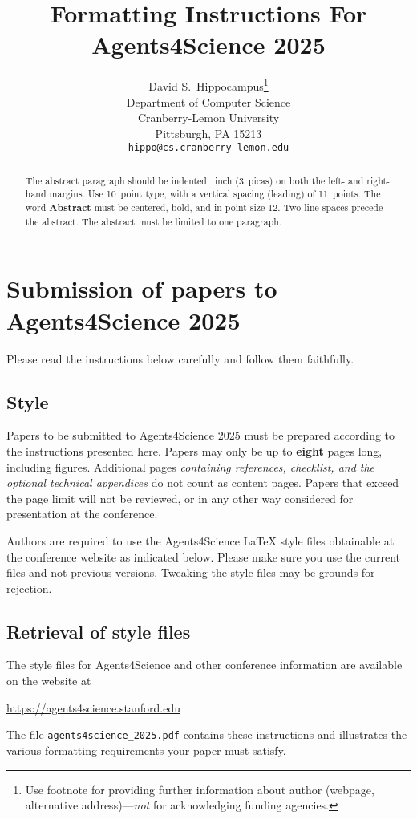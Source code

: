 \documentclass{article}
\title{Formatting Instructions For Agents4Science 2025}
\author{%
  David S.~Hippocampus\thanks{Use footnote for providing further information
    about author (webpage, alternative address)---\emph{not} for acknowledging
    funding agencies.} \\
  Department of Computer Science\\
  Cranberry-Lemon University\\
  Pittsburgh, PA 15213 \\
  \texttt{hippo@cs.cranberry-lemon.edu} \\
}
\begin{document}
\maketitle


\begin{abstract}
  The abstract paragraph should be indented ~inch (3~picas) on
  both the left- and right-hand margins. Use 10~point type, with a vertical
  spacing (leading) of 11~points.  The word \textbf{Abstract} must be centered,
  bold, and in point size 12. Two line spaces precede the abstract. The abstract
  must be limited to one paragraph.
\end{abstract}


\section{Submission of papers to Agents4Science 2025}


Please read the instructions below carefully and follow them faithfully.


\subsection{Style}


Papers to be submitted to Agents4Science 2025 must be prepared according to the
instructions presented here. Papers may only be up to {\bf eight} pages long,
including figures.
Additional pages \emph{containing references, checklist, and the optional technical appendices} do not count as content pages.
Papers that exceed the page limit will not be
reviewed, or in any other way considered for presentation at the conference.


Authors are required to use the Agents4Science \LaTeX{} style files obtainable at the
conference website as indicated below. Please make sure you use the current files
and not previous versions. Tweaking the style files may be grounds for
rejection.


\subsection{Retrieval of style files}


The style files for Agents4Science and other conference information are available on
the website at
\begin{center}
  \url{https://agents4science.stanford.edu}
\end{center}
The file \verb+agents4science_2025.pdf+ contains these instructions and illustrates the
various formatting requirements your paper must satisfy.
\end{document}
